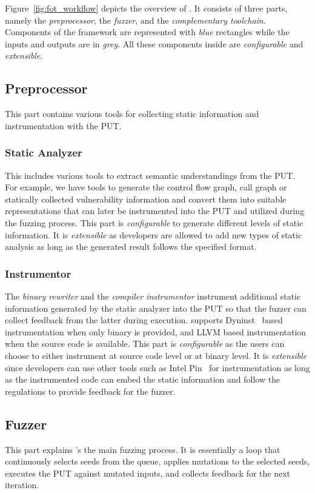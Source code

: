 Figure~\ref{fig:fot_workflow} depicts the overview of {\FOT}.
It consists of three parts, namely the \emph{preprocessor}, the \emph{fuzzer}, and the \emph{complementary toolchain}.
Components of the framework are represented with \emph{blue} rectangles while the inputs and outputs are in \emph{grey}. All these components inside \FOT are \textit{configurable} and \textit{extensible}.


\subsection{Preprocessor}
This part contains various tools for collecting static information and instrumentation with the PUT.


\subsubsection{Static Analyzer}\label{sec:static_analysis}
This includes various tools to extract semantic understandings from the PUT.
For example, we have tools to generate the control flow graph, call graph or statically collected vulnerability information and convert them into suitable representations that can later be instrumented into the PUT and utilized during the fuzzing process.
This part is \textit{configurable} to generate different levels of static information. It is \textit{extensible} as developers are allowed to add new types of static analysis as long as the generated result follows the specified format.


\subsubsection{Instrumentor}
The \emph{binary rewriter} and the \emph{compiler instrumentor} instrument additional static information generated by the static analyzer into the PUT so that the fuzzer can collect feedback from the latter during execution.
{\FOT} supports Dyninst~\cite{dyninst} based instrumentation when only binary is provided, and LLVM based instrumentation when the source code is available.
This part is \textit{configurable} as the users can choose to either instrument at source code level or at binary level.
It is \textit{extensible} since developers can use other tools such as Intel Pin~\cite{pin} for instrumentation as long as the instrumented code can embed the static information and follow the regulations to provide feedback for the fuzzer.

\subsection{Fuzzer}
This part explains {\FOT}'s the main fuzzing process. 
It is essentially a loop that continuously selects seeds from the queue, applies mutations to the selected seeds, executes the PUT against mutated inputs, and collects feedback for the next iteration.

